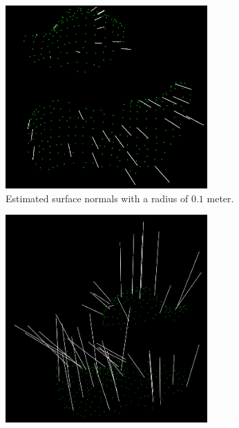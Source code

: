 \documentclass[../main.tex]{subfiles}
\begin{document}
\begin{figure}[H]
    \centering
    \begin{subfigure}[t]{0.19\textwidth}
        \centering
        \captionsetup{width=0.85\textwidth}
        \includegraphics[width=0.85\textwidth]{figures/simulated_depth_sensor/global/normals_1.png}
        \caption{Estimated surface normals with a radius of $0.1$ meter.}
        \label{subfig:sds_normals_0.1}
    \end{subfigure}
    \begin{subfigure}[t]{0.17\textwidth}
        \centering
        \captionsetup{width=0.85\textwidth}
        \includegraphics[width=0.85\textwidth]{figures/simulated_depth_sensor/global/normals_05.png}

\end{subfigure}
\end{figure}
\end{document}
